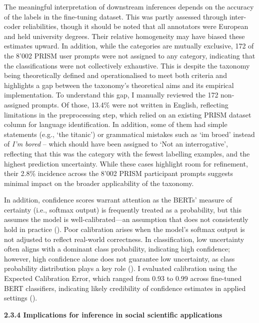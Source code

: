 \documentclass[
  12pt,
]{article}
\begin{document}
The meaningful interpretation of downstream inferences depends on the accuracy of the labels in the fine-tuning dataset. This was partly assessed through inter-coder reliabilities, though it should be noted that all annotators were European and held university degrees. Their relative homogeneity may have biased these estimates upward. In addition, while the categories are mutually exclusive, 172 of the 8'002 PRISM user prompts were not assigned to any category, indicating that the classifications were not collectively exhaustive. This is despite the taxonomy being theoretically defined and operationalised to meet both criteria and highlights a gap between the taxonomy's theoretical aims and its empirical implementation. To understand this gap, I manually reviewed the 172 non-assigned prompts. Of those, 13.4\% were not written in English, reflecting limitations in the preprocessing step, which relied on an existing PRISM dataset column for language identification. In addition, some of them had simple statements (e.g., `the titanic') or grammatical mistakes such as `im broed' instead of \emph{I'm bored} -- which should have been assigned to `Not an interrogative', reflecting that this was the category with the fewest labelling examples, and the highest prediction uncertainty. While these cases highlight room for refinement, their 2.8\% incidence across the 8'002 PRISM participant prompts suggests minimal impact on the broader applicability of the taxonomy.

In addition, confidence scores warrant attention as the BERTs' measure of certainty (i.e., softmax output) is frequently treated as a probability, but this assumes the model is well-calibrated---an assumption that does not consistently hold in practice (). Poor calibration arises when the model's softmax output is not adjusted to reflect real-world correctness. In classification, low uncertainty often aligns with a dominant class probability, indicating high confidence; however, high confidence alone does not guarantee low uncertainty, as class probability distribution plays a key role (). I evaluated calibration using the Expected Calibration Error, which ranged from 0.93 to 0.99 across fine-tuned BERT classifiers, indicating likely credibility of confidence estimates in applied settings ().

\textbf{2.3.4 Implications for inference in social scientific applications}
\end{document}
